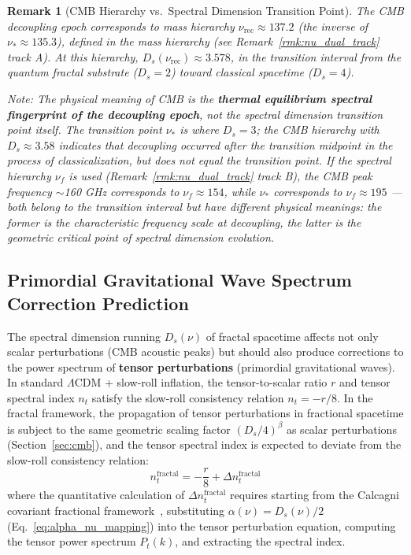 \documentclass[12pt,a4paper,twocolumn]{article}
\newtheorem{remark}[theorem]{Remark}
\begin{document}
\begin{remark}[CMB Hierarchy vs.\ Spectral Dimension Transition Point]
\label{rmk:cmb_layer}
The CMB decoupling epoch corresponds to mass hierarchy $\nu_{\text{rec}} \approx 137.2$ (the inverse of $\nu_* \approx 135.3$), defined in the mass hierarchy (see Remark~\ref{rmk:nu_dual_track} track A). At this hierarchy, $D_s(\nu_{\text{rec}}) \approx 3.578$, in the transition interval from the quantum fractal substrate ($D_s=2$) toward classical spacetime ($D_s=4$).

Note: The physical meaning of CMB is the \textbf{thermal equilibrium spectral fingerprint of the decoupling epoch}, not the spectral dimension transition point itself. The transition point $\nu_*$ is where $D_s = 3$; the CMB hierarchy with $D_s \approx 3.58$ indicates that decoupling occurred after the transition midpoint in the process of classicalization, but does not equal the transition point. If the spectral hierarchy $\nu_f$ is used (Remark~\ref{rmk:nu_dual_track} track B), the CMB peak frequency $\sim$160 GHz corresponds to $\nu_f \approx 154$, while $\nu_*$ corresponds to $\nu_f \approx 195$ --- both belong to the transition interval but have different physical meanings: the former is the characteristic frequency scale at decoupling, the latter is the geometric critical point of spectral dimension evolution.
\end{remark}

\subsection{Primordial Gravitational Wave Spectrum Correction Prediction}
\label{subsec:tensor_spectral}

The spectral dimension running $D_s(\nu)$ of fractal spacetime affects not only scalar perturbations (CMB acoustic peaks) but should also produce corrections to the power spectrum of \textbf{tensor perturbations} (primordial gravitational waves). In standard $\Lambda$CDM + slow-roll inflation, the tensor-to-scalar ratio $r$ and tensor spectral index $n_t$ satisfy the slow-roll consistency relation $n_t = -r/8$. In the fractal framework, the propagation of tensor perturbations in fractional spacetime is subject to the same geometric scaling factor $(D_s/4)^\beta$ as scalar perturbations (Section~\ref{sec:cmb}), and the tensor spectral index is expected to deviate from the slow-roll consistency relation:
\begin{equation}
n_t^{\text{fractal}} = -\frac{r}{8} + \Delta n_t^{\text{fractal}}
\label{eq:nt_fractal}
\end{equation}
where the quantitative calculation of $\Delta n_t^{\text{fractal}}$ requires starting from the Calcagni covariant fractional framework~\cite{SalvadorGarcia2026}, substituting $\alpha(\nu) = D_s(\nu)/2$ (Eq.~\ref{eq:alpha_nu_mapping}) into the tensor perturbation equation, computing the tensor power spectrum $P_t(k)$, and extracting the spectral index.
\end{document}
